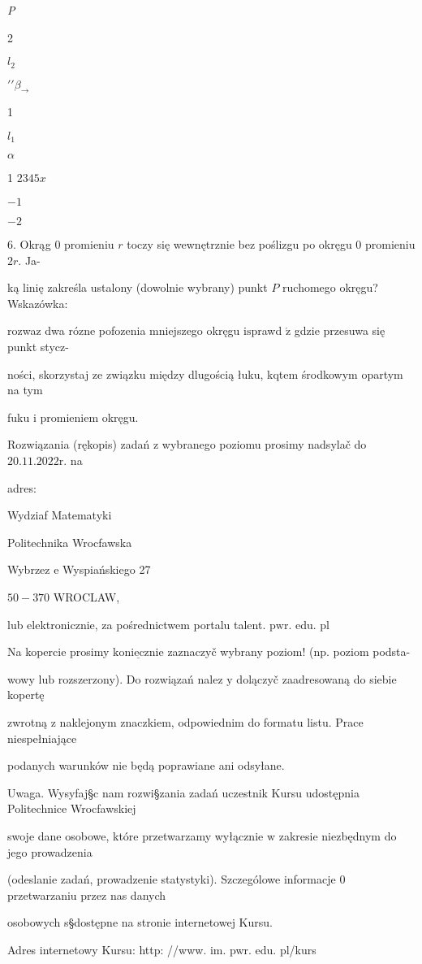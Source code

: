 \documentclass[a4paper,12pt]{article}
\begin{document}
{\it P}

2

$l_{2}$

$\prime\prime\beta_{\rightarrow}$

1

$l_{1}$

$\alpha$

1 $2 3 4 5 x$

$-1$

$-2$

6. Okrąg $0$ promieniu $r$ toczy się wewnętrznie bez poślizgu po okręgu $0$ promieniu $2r$. Ja-

ką linię zakreśla ustalony (dowolnie wybrany) punkt $P$ ruchomego okręgu? Wskazówka:

rozwaz dwa rózne pofozenia mniejszego okręgu $\mathrm{i}\mathrm{s}$prawd $\acute{\mathrm{z}}$ gdzie przesuwa się punkt stycz-

ności, skorzystaj ze związku między dlugością łuku, kqtem środkowym opartym na tym

fuku $\mathrm{i}$ promieniem okręgu.

Rozwiązania (rękopis) zadań $\mathrm{z}$ wybranego poziomu prosimy nadsylač do $20.11.2022\mathrm{r}$. na

adres:

Wydziaf Matematyki

Politechnika Wrocfawska

Wybrzez $\mathrm{e}$ Wyspiańskiego 27

$50-370$ WROCLAW,

lub elektronicznie, za pośrednictwem portalu talent. $\mathrm{p}\mathrm{w}\mathrm{r}$. edu. pl

Na kopercie prosimy $\underline{\mathrm{k}\mathrm{o}\mathrm{n}\mathrm{i}\mathrm{e}\mathrm{c}\mathrm{z}\mathrm{n}\mathrm{i}\mathrm{e}}$ zaznaczyč wybrany poziom! (np. poziom podsta-

wowy $\mathrm{l}\mathrm{u}\mathrm{b}$ rozszerzony). Do rozwiązań nalez $\mathrm{y}$ dolączyč zaadresowaną do siebie kopertę

zwrotną $\mathrm{z}$ naklejonym znaczkiem, odpowiednim do formatu listu. Prace niespełniające

podanych warunków nie będą poprawiane ani odsyłane.

Uwaga. Wysyfaj\S c nam rozwi\S zania zadań uczestnik Kursu udostępnia Politechnice Wrocfawskiej

swoje dane osobowe, które przetwarzamy wyłącznie $\mathrm{w}$ zakresie niezbędnym do jego prowadzenia

(odeslanie zadań, prowadzenie statystyki). Szczególowe informacje $0$ przetwarzaniu przez nas danych

osobowych s\S dostępne na stronie internetowej Kursu.

Adres internetowy Kursu: http: //www. im. pwr. edu. pl/kurs
\end{document}
